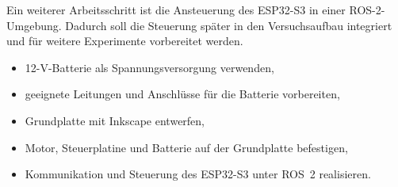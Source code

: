 \documentclass[a4paper,12pt]{article}
\begin{document}
Ein weiterer Arbeitsschritt ist die Ansteuerung des ESP32-S3 in einer
ROS-2-Umgebung. Dadurch soll die Steuerung später in den Versuchsaufbau
integriert und für weitere Experimente vorbereitet werden.

\begin{itemize}
    \item 12-V-Batterie als Spannungsversorgung verwenden,
    \item geeignete Leitungen und Anschlüsse für die Batterie vorbereiten,
    \item Grundplatte mit Inkscape entwerfen,
    \item Motor, Steuerplatine und Batterie auf der Grundplatte befestigen,
    \item Kommunikation und Steuerung des ESP32-S3 unter ROS~2 realisieren.
\end{itemize}
\end{document}
